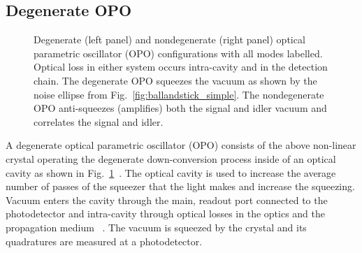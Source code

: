 \subsection{Degenerate OPO}

\begin{figure}
	\centering
	\caption{
	Degenerate (left panel) and nondegenerate (right panel) optical parametric oscillator (OPO) configurations with all modes labelled. 
	Optical loss in either system occurs intra-cavity and in the detection chain.
	The degenerate OPO squeezes the vacuum as shown by the noise ellipse from Fig.~\ref{fig:ballandstick_simple}. The nondegenerate OPO anti-squeezes (amplifies) both the signal and idler vacuum and correlates the signal and idler.}
	\label{fig:OPOs_config}
\end{figure}

A degenerate optical parametric oscillator (OPO) consists of the above non-linear crystal operating the degenerate down-conversion process inside of an optical cavity as shown in Fig.~\ref{fig:OPOs_config}~\cite{}. The optical cavity is used to increase the average number of passes of the squeezer that the light makes and increase the squeezing. Vacuum enters the cavity through the main, readout port connected to the photodetector and intra-cavity through optical losses in the optics and the propagation medium~\cite{} . The vacuum is squeezed by the crystal and its quadratures are measured at a photodetector.

